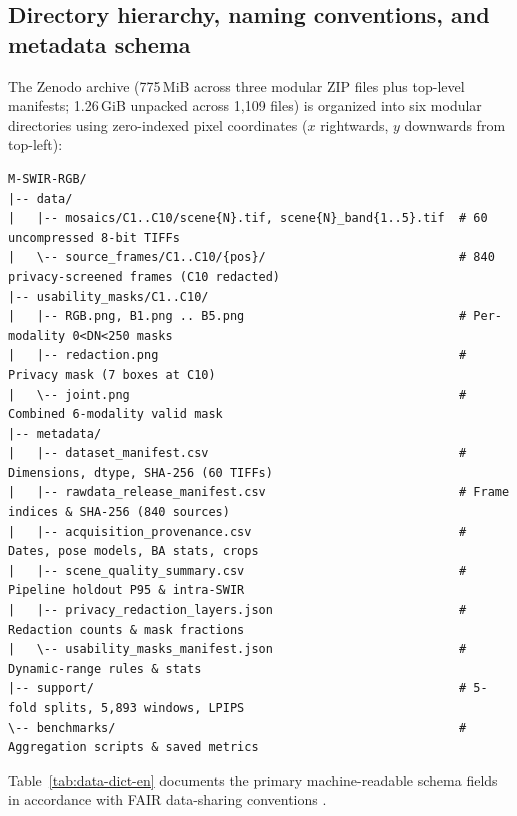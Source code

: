 \documentclass[a4paper,10pt]{article}
\begin{document}
\subsection{Directory hierarchy, naming conventions, and metadata schema}
The Zenodo archive (775\,MiB across three modular ZIP files plus top-level manifests; 1.26\,GiB unpacked across 1,109 files) is organized into six modular directories using zero-indexed pixel coordinates ($x$ rightwards, $y$ downwards from top-left):
{\footnotesize\begin{verbatim}
M-SWIR-RGB/
|-- data/
|   |-- mosaics/C1..C10/scene{N}.tif, scene{N}_band{1..5}.tif  # 60 uncompressed 8-bit TIFFs
|   \-- source_frames/C1..C10/{pos}/                           # 840 privacy-screened frames (C10 redacted)
|-- usability_masks/C1..C10/
|   |-- RGB.png, B1.png .. B5.png                              # Per-modality 0<DN<250 masks
|   |-- redaction.png                                          # Privacy mask (7 boxes at C10)
|   \-- joint.png                                              # Combined 6-modality valid mask
|-- metadata/
|   |-- dataset_manifest.csv                                   # Dimensions, dtype, SHA-256 (60 TIFFs)
|   |-- rawdata_release_manifest.csv                           # Frame indices & SHA-256 (840 sources)
|   |-- acquisition_provenance.csv                             # Dates, pose models, BA stats, crops
|   |-- scene_quality_summary.csv                              # Pipeline holdout P95 & intra-SWIR
|   |-- privacy_redaction_layers.json                          # Redaction counts & mask fractions
|   \-- usability_masks_manifest.json                          # Dynamic-range rules & stats
|-- support/                                                   # 5-fold splits, 5,893 windows, LPIPS
\-- benchmarks/                                                # Aggregation scripts & saved metrics
\end{verbatim}}

Table~\ref{tab:data-dict-en} documents the primary machine-readable schema fields in accordance with FAIR data-sharing conventions \cite{sansone2019,starr2015,wilkinson2016}.
\end{document}
